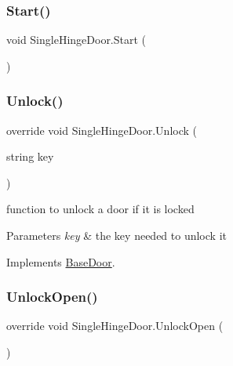 \subsubsection{\texorpdfstring{Start()}{Start()}}
{\footnotesize\ttfamily void Single\+Hinge\+Door.\+Start (\begin{DoxyParamCaption}{ }\end{DoxyParamCaption})\hspace{0.3cm}{\ttfamily [private]}}

\mbox{\label{class_single_hinge_door_a130d674b08d4b9e8028b08ef2084ab77}} 
\subsubsection{\texorpdfstring{Unlock()}{Unlock()}}
{\footnotesize\ttfamily override void Single\+Hinge\+Door.\+Unlock (\begin{DoxyParamCaption}\item[{string}]{key }\end{DoxyParamCaption})\hspace{0.3cm}{\ttfamily [virtual]}}



function to unlock a door if it is locked 


\begin{DoxyParams}{Parameters}
{\em key} & the key needed to unlock it\\
\hline
\end{DoxyParams}


Implements \mbox{\hyperlink{class_base_door_a1fe85317a4742aec4d03deb7c0d52fd2}{Base\+Door}}.

\mbox{\label{class_single_hinge_door_a5e5785f02f35b8b109d4c50d3f912013}} 
\subsubsection{\texorpdfstring{Unlock\+Open()}{UnlockOpen()}}
{\footnotesize\ttfamily override void Single\+Hinge\+Door.\+Unlock\+Open (\begin{DoxyParamCaption}{ }\end{DoxyParamCaption})\hspace{0.3cm}{\ttfamily [virtual]}}



